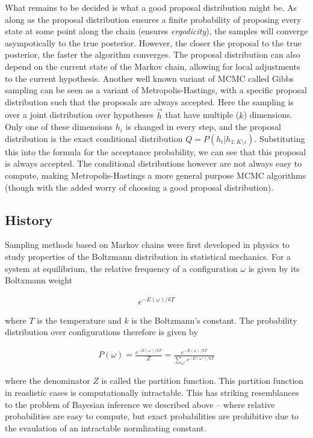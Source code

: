 What remains to be decided is what a good proposal distribution might be. As along as the proposal distribution ensures a finite probability of proposing every state at some point along the chain (ensures \textit{ergodicity}), the samples will converge asympotically to the true posterior. However, the closer the proposal to the true posterior, the faster the algorithm converges\cite{holden1998geometric}. The proposal distribution can also depend on the current state of the Markov chain, allowing for local adjustments to the current hypothesis. Another well known variant of MCMC called Gibbs sampling can be seen as a variant of Metropolis-Hastings, with a specific proposal distribution such that the proposals are always accepted. Here the sampling is over a joint distribution over hypotheses $\vec{h}$ that have multiple ($k$) dimensions. Only one of these dimensions $h_i$ is changed in every step, and the proposal distribution is the exact conditional distribution $Q = P(h_i | h_{1:K\setminus i})$. Substituting this into the formula for the acceptance probability, we can see that this proposal is always accepted. The conditional distributions however are not always easy to compute, making Metropolis-Hastings a more general purpose MCMC algorithms (though with the added worry of choosing a good proposal distribution).

\subsection{History}
Sampling methods based on Markov chains were first developed in physics to study properties of the Boltzmann distribution in statistical mechanics. \cite{metropolis1953equation} For a system at equilibrium, the relative frequency of a configuration $\omega$ is given by its Boltxmann weight

\begin{align}
e ^{-E(\omega) / kT}
\end{align}

where $T$ is the temperature and $k$ is the Boltzmann's constant. The probability distribution over configurations therefore is given by 

\begin{align}
P(\omega) = \frac{ e ^{-E(\omega) / kT}} {Z} = \frac{ e ^{-E(\omega) / kT}} {\sum_{\omega'} e ^{-E(\omega') / kT}}
\end{align}

where the denominator $Z$ is called the partition function. This partition function in reaslistic cases is computationally intractable. This has striking resemblances to the problem of Bayesian inference we described above -- where relative probabilities are easy to compute, but exact probabilities are prohibitive due to the evaulation of an intractable normlizating constant. 

